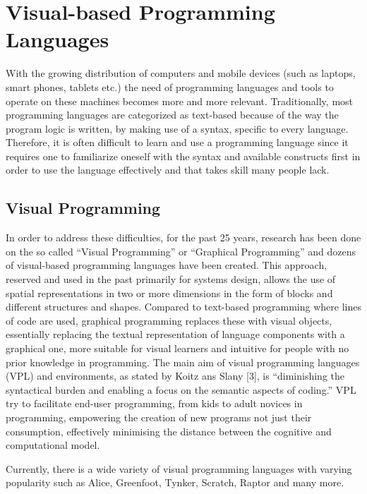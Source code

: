 \chapter{Visual-based Programming Languages}
\label{chap:visual_based_programming_languages}
With the growing distribution of computers and mobile devices (such as laptops, smart phones, tablets etc.) the need of programming languages and tools to operate on these machines becomes more and more relevant. Traditionally, most programming languages are categorized as text-based because of the way the program logic is written, by making use of a syntax, specific to every language. Therefore, it is often difficult to learn and use a programming language since it requires one to familiarize oneself with the syntax and available constructs first in order to use the language effectively and that takes skill many people lack. 

\section{Visual Programming}
In order to address these difficulties, for the past 25 years, research has been done on the so called “Visual Programming” or “Graphical Programming” and dozens of visual-based programming languages have been created. This approach, reserved and used in the past primarily for systems design, allows the use of spatial representations in two or more dimensions in the form of blocks and different structures and shapes. Compared to text-based programming where lines of code are used, graphical programming replaces these with visual objects, essentially replacing the textual representation of language components with a graphical one, more suitable for visual learners and intuitive for people with no prior knowledge in programming. The main aim of visual programming languages (VPL) and environments, as stated by Koitz ans Slany [3], is “diminishing the syntactical burden and enabling a focus on the semantic aspects of coding.” VPL try to facilitate end-user programming, from kids to adult novices in programming, empowering the creation of new programs not just their consumption, effectively minimising the distance between the cognitive and computational model.

Currently, there is a wide variety of visual programming languages with varying popularity such as Alice, Greenfoot, Tynker, Scratch, Raptor and many more.

